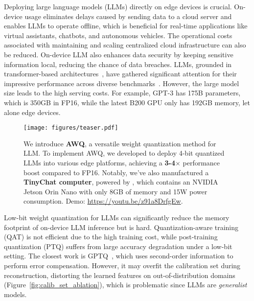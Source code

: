 Deploying large language models (LLMs) directly on edge devices is crucial. On-device usage eliminates delays caused by sending data to a cloud server and enables LLMs to operate offline, which is beneficial for real-time applications like virtual assistants, chatbots, and autonomous vehicles. The operational costs associated with maintaining and scaling centralized cloud infrastructure can also be reduced. On-device LLM also enhances data security by keeping sensitive information local, reducing the chance of data breaches. LLMs, grounded in transformer-based architectures~\cite{vaswani2017attention}, have gathered significant attention for their impressive performance across diverse benchmarks~\cite{gpt3, opt, touvron2023llama, scao2022bloom}. However, the large model size leads to the high serving costs. For example, GPT-3 has 175B parameters, which is 350GB in FP16, while the latest B200 GPU only has 192GB memory, let alone edge devices.

\begin{figure}
    \centering
     \texttt{[image: figures/teaser.pdf]}
    \caption{We introduce \textbf{AWQ}, a versatile weight quantization method for LLM. To implement AWQ, we developed \textbf{\system} to deploy 4-bit quantized LLMs into various edge platforms, achieving a \textbf{3-4$\times$} performance boost compared to FP16. Notably, we've also manufactured a \textbf{TinyChat computer}, powered by \system, which contains an NVIDIA Jetson Orin Nano with only 8GB of memory and 15W power consumption. Demo: \url{https://youtu.be/z91a8DrfgEw}.} 
    \label{fig:teaser}
\end{figure}

Low-bit weight quantization for LLMs can significantly reduce the memory footprint of on-device LLM inference but is hard.
Quantization-aware training (QAT) is not efficient due to the high training cost, while post-training quantization (PTQ) suffers from large accuracy degradation under a low-bit setting. The closest work is GPTQ~\cite{frantar2022gptq}, which uses second-order information to perform error compensation. 
However, it may overfit the calibration set during reconstruction, distorting the learned features on out-of-distribution domains (Figure~\ref{fig:calib_set_ablation}), which is problematic since LLMs are \emph{generalist} models. 

